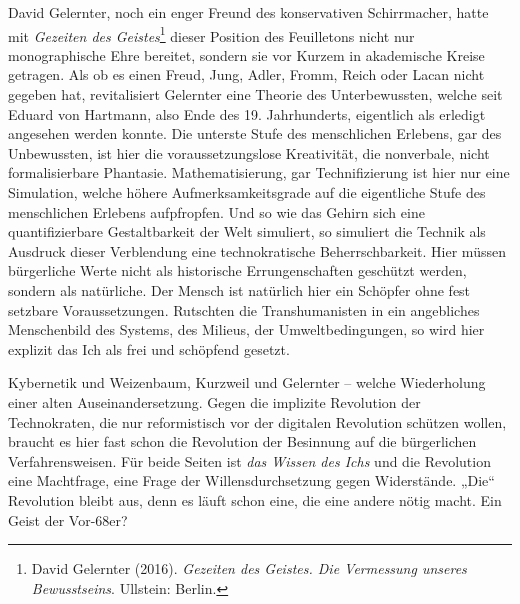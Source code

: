 \documentclass[a4paper,11pt]{article}
\begin{document}
David Gelernter, noch ein enger Freund des konservativen Schirrmacher, hatte
mit \emph{Gezeiten des Geistes}\footnote{David Gelernter (2016).
  \emph{Gezeiten des Geistes.  Die Vermessung unseres Bewusstseins}.
  Ullstein: Berlin. } dieser Position des Feuilletons nicht nur monographische
Ehre bereitet, sondern sie vor Kurzem in akademische Kreise getragen. Als ob
es einen Freud, Jung, Adler, Fromm, Reich oder Lacan nicht gegeben hat,
revitalisiert Gelernter eine Theorie des Unterbewussten, welche seit Eduard
von Hartmann, also Ende des 19. Jahrhunderts, eigentlich als erledigt
angesehen werden konnte. Die unterste Stufe des menschlichen Erlebens, gar des
Unbewussten, ist hier die voraussetzungslose Kreativität, die nonverbale,
nicht formalisierbare Phantasie. Mathematisierung, gar Technifizierung ist
hier nur eine Simulation, welche höhere Aufmerksamkeitsgrade auf die
eigentliche Stufe des menschlichen Erlebens aufpfropfen. Und so wie das Gehirn
sich eine quantifizierbare Gestaltbarkeit der Welt simuliert, so simuliert die
Technik als Ausdruck dieser Verblendung eine technokratische
Beherrschbarkeit. Hier müssen bürgerliche Werte nicht als historische
Errungenschaften geschützt werden, sondern als natürliche. Der Mensch ist
natürlich hier ein Schöpfer ohne fest setzbare Voraussetzungen. Rutschten die
Transhumanisten in ein angebliches Menschenbild des Systems, des Milieus, der
Umweltbedingungen, so wird hier explizit das Ich als frei und schöpfend
gesetzt.

Kybernetik und Weizenbaum, Kurzweil und Gelernter -- welche Wiederholung einer
alten Auseinandersetzung. Gegen die implizite Revolution der Technokraten, die
nur reformistisch vor der digitalen Revolution schützen wollen, braucht es
hier fast schon die Revolution der Besinnung auf die bürgerlichen
Verfahrensweisen.  Für beide Seiten ist \emph{das Wissen des Ichs} und die
Revolution eine Machtfrage, eine Frage der Willensdurchsetzung gegen
Widerstände. „Die“ Revolution bleibt aus, denn es läuft schon eine, die eine
andere nötig macht. Ein Geist der Vor-68er?
\end{document}
